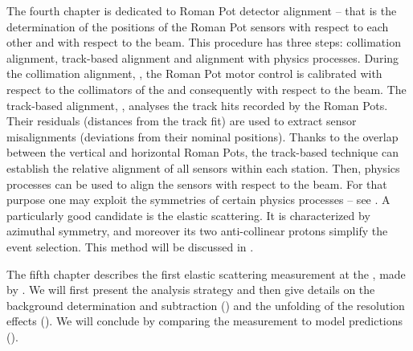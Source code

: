 The fourth chapter is dedicated to Roman Pot detector alignment -- that is the determination of the positions of the Roman Pot sensors with respect to each other and with respect to the beam. This procedure has three steps: collimation alignment, track-based alignment and alignment with physics processes. During the collimation alignment, , the Roman Pot motor control is calibrated with respect to the collimators of the  and consequently with respect to the beam. The track-based alignment, , analyses the track hits recorded by the Roman Pots. Their residuals (distances from the track fit) are used to extract sensor misalignments (deviations from their nominal positions). Thanks to the overlap between the vertical and horizontal Roman Pots, the track-based technique can establish the relative alignment of all sensors within each station. Then, physics processes can be used to align the sensors with respect to the beam. For that purpose one may exploit the symmetries of certain physics processes -- see . A particularly good candidate is the elastic scattering. It is characterized by azimuthal symmetry, and moreover its two anti-collinear protons
simplify the event selection. This method will be discussed in .

The fifth chapter describes the first elastic scattering measurement at the , made by . We will first present the analysis strategy and then give details on the background determination and subtraction () and the unfolding of the resolution effects (). We will conclude by comparing the measurement to model predictions ().




\def\CaptionPrefix{\currentChapterNumber.}
